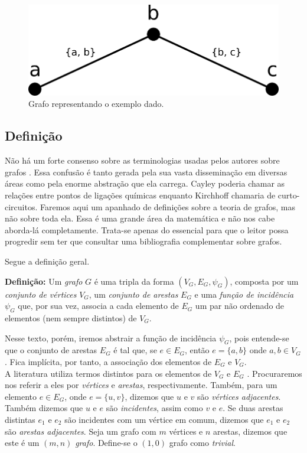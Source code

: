 \documentclass[a4paper,12pt]{article}
\begin{document}
\begin{figure}[H]
	\begin{center}
		\includegraphics[width=0.35\linewidth]{figures/socialGraph.png}
	\end{center}
	\caption{Grafo representando o exemplo dado.}
	\label{fig:socialGraph}
\end{figure}

\subsection{Definição}

Não há um forte consenso sobre as terminologias usadas pelos autores sobre grafos \cite{graphTheoryFHarary}. Essa confusão é tanto gerada pela sua vasta disseminação em diversas áreas como pela enorme abstração que ela carrega. Cayley poderia chamar as relações entre pontos de ligações químicas enquanto Kirchhoff chamaria de curto-circuitos.
Faremos aqui um apanhado de definições sobre a teoria de grafos, mas não sobre toda ela. Essa é uma grande área da matemática e não nos cabe aborda-lá completamente. Trata-se apenas do essencial para que o leitor possa progredir sem ter que consultar uma bibliografia complementar sobre grafos.

Segue a definição geral.

\begin{center}
	\begin{minipage}{0.9 \linewidth}
		\textbf{Definição:} Um \textit{grafo} $G$ é uma tripla da forma $(V_G,E_G, \psi_{G})$, composta por um \textit{conjunto de vértices} $V_G$, um \textit{conjunto de arestas} $E_G$ e uma \textit{função de incidência} $\psi_{G}$ que, por sua vez, associa a cada elemento de $E_G$ um par não ordenado de elementos (nem sempre distintos) de $V_G$.
	\end{minipage}
\end{center} 

Nesse texto, porém, iremos abstrair a função de incidência $\psi_G$, pois entende-se que o conjunto de arestas $E_G$ é tal que, se $e \in E_G$, então $e = \{a, b\}$ onde $a, b \in V_G$. Fica implícita, por tanto, a associação dos elementos de  $E_G$ e $V_G$.
\\

A literatura utiliza termos distintos para os elementos de $V_G$ e $E_G$ \cite{graphTheoryFHarary}. Procuraremos nos referir a eles por \textit{vértices} e \textit{arestas}, respectivamente. Também, para um elemento $e \in E_G$, onde $e = \{u, v\}$, dizemos que $u$ e $v$ são \textit{vértices adjacentes}. Também dizemos que $u$ e $e$ são \textit{incidentes}, assim como $v$ e $e$. Se duas arestas distintas $e_1$ e $e_2$ são incidentes com um vértice em comum, dizemos que $e_1$ e $e_2$ são \textit{arestas adjacentes}. Seja um grafo com $m$ vértices e $n$ arestas, dizemos que este é um $(m, n)$ \textit{grafo}. Define-se o $(1,0)$ grafo como \textit{trivial}.
\end{document}
